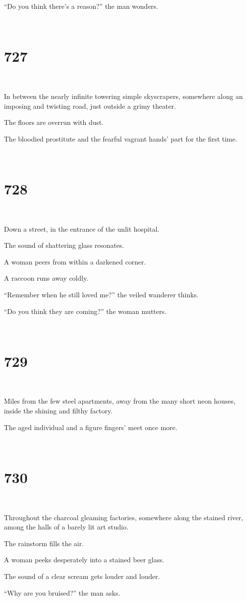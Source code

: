 \documentclass{report}
\begin{document}
``Do you think there's a reason?'' the man wonders.

~
\chapter*{727}
~

In between the nearly infinite towering simple skyscrapers, somewhere along an imposing and twisting road, just outside a grimy theater.

The floors are overrun with dust.

The bloodied prostitute and the fearful vagrant hands' part for the first time.

~
\chapter*{728}
~

Down a street, in the entrance of the unlit hospital.

The sound of shattering glass resonates.

A woman peers from within a darkened corner.

A raccoon runs away coldly.

``Remember when he still loved me?'' the veiled wanderer thinks.

``Do you think they are coming?'' the woman mutters.

~
\chapter*{729}
~

Miles from the few steel apartments, away from the many short neon houses, inside the shining and filthy factory.

The aged individual and a figure fingers' meet once more.

~
\chapter*{730}
~

Throughout the charcoal gleaming factories, somewhere along the stained river, among the halls of a barely lit art studio.

The rainstorm fills the air.

A woman peeks desperately into a stained beer glass.

The sound of a clear scream gets louder and louder.

``Why are you bruised?'' the man asks.
\end{document}

